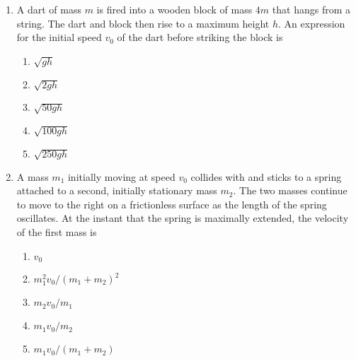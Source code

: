 \documentclass{../../../oss-apphys}
\begin{document}
\begin{multicols*}{2}
\begin{enumerate}[resume,leftmargin=18pt]
  \item A dart of mass $m$ is fired into a wooden block of mass $4m$ that hangs
    from a string. The dart and block then rise to a maximum height $h$. An
    expression for the initial speed $v_0$ of the dart before striking the block
    is
    \begin{enumerate}[nosep,leftmargin=18pt,label=(\Alph*)]
    \item$\sqrt{gh}$
    \item$\sqrt{2gh}$
    \item$\sqrt{50gh}$
    \item$\sqrt{100gh}$
    \item$\sqrt{250gh}$
    \end{enumerate}

  \item A mass $m_1$ initially moving at speed $v_0$ collides with and sticks
    to a spring attached to a second, initially stationary mass $m_2$. The two
    masses continue to move to the right on a frictionless surface as the
    length of the spring oscillates. At the instant that the spring is
    maximally extended, the velocity of the first mass is
    \begin{center}
    \end{center}
    \begin{enumerate}[nosep,leftmargin=18pt,label=(\Alph*)]
    \item $v_0$
    \item $m_1^2v_0/(m_1+m_2)^2$
    \item $m_2v_0/m_1$
    \item $m_1v_0/m_2$
    \item $m_1v_0/(m_1+m_2)$
    \end{enumerate}
  \end{enumerate}
  \columnbreak
  

\end{multicols*}
\end{document}

